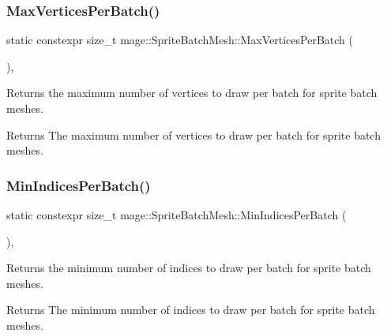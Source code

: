 \subsubsection{\texorpdfstring{Max\+Vertices\+Per\+Batch()}{MaxVerticesPerBatch()}}
{\footnotesize\ttfamily static constexpr size\+\_\+t mage\+::\+Sprite\+Batch\+Mesh\+::\+Max\+Vertices\+Per\+Batch (\begin{DoxyParamCaption}{ }\end{DoxyParamCaption})\hspace{0.3cm}{\ttfamily [static]}, {\ttfamily [noexcept]}}

Returns the maximum number of vertices to draw per batch for sprite batch meshes.

\begin{DoxyReturn}{Returns}
The maximum number of vertices to draw per batch for sprite batch meshes. 
\end{DoxyReturn}
\hypertarget{classmage_1_1_sprite_batch_mesh_af97c5b660417a70f9a0365c74279ef3e}{}\label{classmage_1_1_sprite_batch_mesh_af97c5b660417a70f9a0365c74279ef3e} 
\subsubsection{\texorpdfstring{Min\+Indices\+Per\+Batch()}{MinIndicesPerBatch()}}
{\footnotesize\ttfamily static constexpr size\+\_\+t mage\+::\+Sprite\+Batch\+Mesh\+::\+Min\+Indices\+Per\+Batch (\begin{DoxyParamCaption}{ }\end{DoxyParamCaption})\hspace{0.3cm}{\ttfamily [static]}, {\ttfamily [noexcept]}}

Returns the minimum number of indices to draw per batch for sprite batch meshes.

\begin{DoxyReturn}{Returns}
The minimum number of indices to draw per batch for sprite batch meshes. 
\end{DoxyReturn}
\hypertarget{classmage_1_1_sprite_batch_mesh_a489cec36c8cee8ece130b2c22597c711}{}\label{classmage_1_1_sprite_batch_mesh_a489cec36c8cee8ece130b2c22597c711} 
